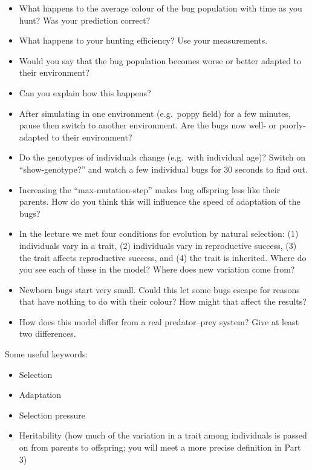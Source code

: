 \documentclass[
  a4paper]{book}
\providecommand{\tightlist}{%
  \setlength{\itemsep}{0pt}\setlength{\parskip}{0pt}}
\begin{document}
\begin{itemize}
\tightlist
\item
  What happens to the average colour of the bug population with time as you hunt? Was your prediction correct?
\item
  What happens to your hunting efficiency? Use your measurements.
\item
  Would you say that the bug population becomes worse or better adapted to their environment?
\item
  Can you explain how this happens?
\item
  After simulating in one environment (e.g.~poppy field) for a few minutes, pause then switch to another environment. Are the bugs now well- or poorly-adapted to their environment?
\item
  Do the genotypes of individuals change (e.g.~with individual age)? Switch on ``show-genotype?'' and watch a few individual bugs for 30 seconds to find out.
\item
  Increasing the ``max-mutation-step'' makes bug offspring less like their parents. How do you think this will influence the speed of adaptation of the bugs?
\item
  In the lecture we met four conditions for evolution by natural selection: (1) individuals vary in a trait, (2) individuals vary in reproductive success, (3) the trait affects reproductive success, and (4) the trait is inherited. Where do you see each of these in the model? Where does new variation come from?
\item
  Newborn bugs start very small. Could this let some bugs escape for reasons that have nothing to do with their colour? How might that affect the results?
\item
  How does this model differ from a real predator--prey system? Give at least two differences.
\end{itemize}

Some useful keywords:

\begin{itemize}
\tightlist
\item
  Selection
\item
  Adaptation
\item
  Selection pressure
\item
  Heritability (how much of the variation in a trait among individuals is passed on from parents to offspring; you will meet a more precise definition in Part 3)
\end{itemize}
\end{document}
